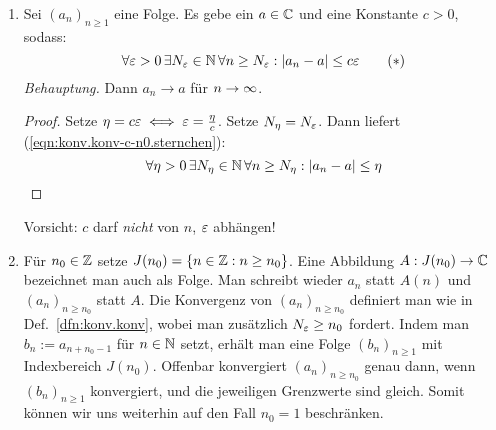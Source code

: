 \documentclass[12pt]{scrreprt}
\begin{document}
\begin{bem}
\label{bem:konv.konv-c-n0}
\begin{enumerate}
\item Sei $(a_n)_{n\ge1}$ eine Folge. Es gebe ein $a\in\mathbb{C}$ und eine Konstante $c>0$, sodass:
\begin{equation}\label{eqn:konv.konv-c-n0.sternchen}
\forall\varepsilon>0\,\exists N_\varepsilon\in\mathbb{N}\,\forall n\ge N_\varepsilon:\left\lvert a_n-a\right\lvert\le c\varepsilon
\tag{$*$}
\end{equation}
\emph{Behauptung.} Dann $a_n \to a$ für $n\rightarrow\infty$.\\
\begin{proof} Setze $\eta=c\varepsilon \iff \varepsilon=\frac \eta c$. Setze $N_\eta=N_\varepsilon$. Dann liefert (\ref{eqn:konv.konv-c-n0.sternchen}):
\[\forall\eta>0\,\exists N_\eta\in\mathbb{N}\,\forall n\ge N_\eta:\left\lvert a_n-a\right\lvert\le \eta\]
\end{proof}
Vorsicht: $c$ darf \emph{nicht} von $n$, $\varepsilon$ abhängen! \label{bem:konv.konv-c-n0.a}
\item Für $n_0\in\mathbb{Z}$ setze $J(n_0)=\{n\in\mathbb{Z}:n\ge n_0\}$. Eine Abbildung $A: J(n_0)\rightarrow\mathbb{C}$ bezeichnet man auch als Folge. Man schreibt wieder $a_n$ statt $A(n)$ und $(a_n)_{n\ge n_0}$ statt $A$. Die Konvergenz von $(a_n)_{n\ge n_0}$ definiert man wie in Def.~\ref{dfn:konv.konv}, wobei man zusätzlich $N_\varepsilon\ge n_0$ fordert. Indem man $b_n:=a_{n+n_0-1}$ für $n\in\mathbb{N}$ setzt, erhält man eine Folge $(b_n)_{n\ge1}$ mit Indexbereich $J(n_0)$. Offenbar konvergiert $(a_n)_{n\ge n_0}$ genau dann, wenn $(b_n)_{n\ge1}$ konvergiert, und die jeweiligen Grenzwerte sind gleich. Somit können wir uns weiterhin auf den Fall $n_0=1$ beschränken. \label{bem:konv.konv-c-n0.b}
\end{enumerate}
\end{bem}
\end{document}
